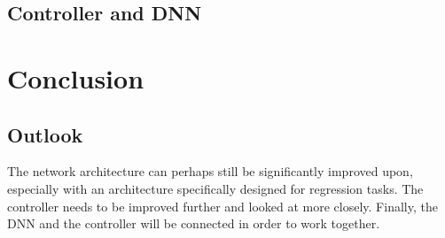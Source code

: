 \documentclass[10pt,a4paper,twoside,journal]{IEEEtran}
\begin{document}
\subsection{Controller and DNN}



\section{Conclusion}
\label{sc:conclusion}

\subsection{Outlook}
\label{ssc:outlook}
The network architecture can perhaps still be significantly improved upon, especially with an architecture specifically designed for regression tasks. 
The controller needs to be improved further and looked at more closely. Finally, the DNN and the controller will be connected in order to work together.




\end{document}
